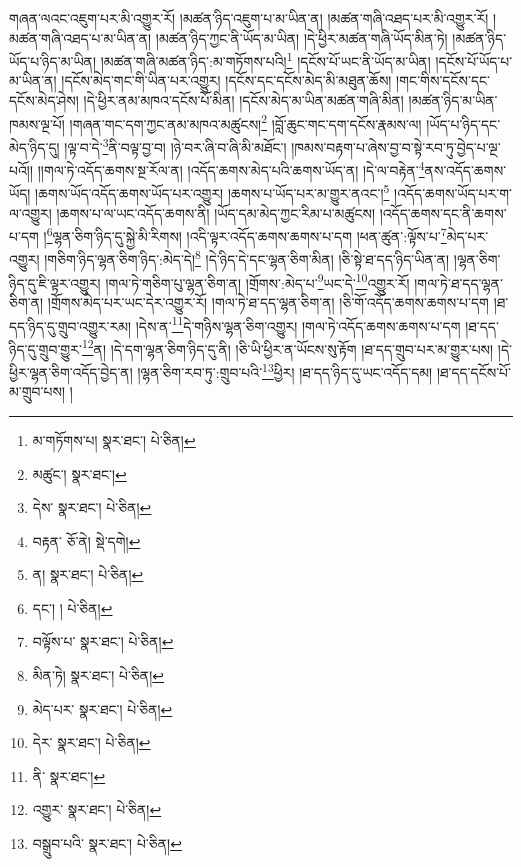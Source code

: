 གཞན་ལའང་འཇུག་པར་མི་འགྱུར་རོ། །མཚན་ཉིད་འཇུག་པ་མ་ཡིན་ན། །མཚན་གཞི་འཐད་པར་མི་འགྱུར་རོ། །མཚན་གཞི་འཐད་པ་མ་ཡིན་ན། །མཚན་ཉིད་ཀྱང་ནི་ཡོད་མ་ཡིན། །དེ་ཕྱིར་མཚན་གཞི་ཡོད་མིན་ཏེ། །མཚན་ཉིད་ཡོད་པ་ཉིད་མ་ཡིན། །མཚན་གཞི་མཚན་ཉིད་:མ་གཏོགས་པའི།\footnote{མ་གཏོགས་པ།  སྣར་ཐང་།  པེ་ཅིན། } །དངོས་པོ་ཡང་ནི་ཡོད་མ་ཡིན། །དངོས་པོ་ཡོད་པ་མ་ཡིན་ན། །དངོས་མེད་གང་གི་ཡིན་པར་འགྱུར། །དངོས་དང་དངོས་མེད་མི་མཐུན་ཆོས། །གང་གིས་དངོས་དང་དངོས་མེད་ཤེས། །དེ་ཕྱིར་ནམ་མཁའ་དངོས་པོ་མིན། །དངོས་མེད་མ་ཡིན་མཚན་གཞི་མིན། །མཚན་ཉིད་མ་ཡིན་ཁམས་ལྔ་པོ། །གཞན་གང་དག་ཀྱང་ནམ་མཁའ་མཚུངས།\footnote{མཚུང་།  སྣར་ཐང་། } །བློ་ཆུང་གང་དག་དངོས་རྣམས་ལ། །ཡོད་པ་ཉིད་དང་མེད་ཉིད་དུ། །ལྟ་བ་དེ་\footnote{དེས་  སྣར་ཐང་།  པེ་ཅིན། }ནི་བལྟ་བྱ་བ། །ཉེ་བར་ཞི་བ་ཞི་མི་མཐོང་། །ཁམས་བརྟག་པ་ཞེས་བྱ་བ་སྟེ་རབ་ཏུ་བྱེད་པ་ལྔ་པའོ།། །།གལ་ཏེ་འདོད་ཆགས་སྔ་རོལ་ན། །འདོད་ཆགས་མེད་པའི་ཆགས་ཡོད་ན། །དེ་ལ་བརྟེན་\footnote{བརྟན་  ཅོ་ནེ།  སྡེ་དགེ། }ནས་འདོད་ཆགས་ཡོད། །ཆགས་ཡོད་འདོད་ཆགས་ཡོད་པར་འགྱུར། །ཆགས་པ་ཡོད་པར་མ་གྱུར་ནའང་།\footnote{ན།  སྣར་ཐང་།  པེ་ཅིན། } །འདོད་ཆགས་ཡོད་པར་ག་ལ་འགྱུར། །ཆགས་པ་ལ་ཡང་འདོད་ཆགས་ནི། །ཡོད་དམ་མེད་ཀྱང་རིམ་པ་མཚུངས། །འདོད་ཆགས་དང་ནི་ཆགས་པ་དག །\footnote{དང་། །  པེ་ཅིན། }ལྷན་ཅིག་ཉིད་དུ་སྐྱེ་མི་རིགས། །འདི་ལྟར་འདོད་ཆགས་ཆགས་པ་དག །ཕན་ཚུན་:ལྟོས་པ་\footnote{བལྟོས་པ་  སྣར་ཐང་།  པེ་ཅིན། }མེད་པར་འགྱུར། །གཅིག་ཉིད་ལྷན་ཅིག་ཉིད་:མེད་དེ།\footnote{མིན་ཏེ།  སྣར་ཐང་།  པེ་ཅིན། } །དེ་ཉིད་དེ་དང་ལྷན་ཅིག་མིན། །ཅི་སྟེ་ཐ་དད་ཉིད་ཡིན་ན། །ལྷན་ཅིག་ཉིད་དུ་ཇི་ལྟར་འགྱུར། །གལ་ཏེ་གཅིག་པུ་ལྷན་ཅིག་ན། །གྲོགས་:མེད་པ་\footnote{མེད་པར་  སྣར་ཐང་།  པེ་ཅིན། }ཡང་དེ་\footnote{དེར་  སྣར་ཐང་།  པེ་ཅིན། }འགྱུར་རོ། །གལ་ཏེ་ཐ་དད་ལྷན་ཅིག་ན། །གྲོགས་མེད་པར་ཡང་དེར་འགྱུར་རོ། །གལ་ཏེ་ཐ་དད་ལྷན་ཅིག་ན། །ཅི་གོ་འདོད་ཆགས་ཆགས་པ་དག །ཐ་དད་ཉིད་དུ་གྲུབ་འགྱུར་རམ། །དེས་ན་\footnote{ནི་  སྣར་ཐང་། }དེ་གཉིས་ལྷན་ཅིག་འགྱུར། །གལ་ཏེ་འདོད་ཆགས་ཆགས་པ་དག །ཐ་དད་ཉིད་དུ་གྲུབ་གྱུར་\footnote{འགྱུར་  སྣར་ཐང་།  པེ་ཅིན། }ན། །དེ་དག་ལྷན་ཅིག་ཉིད་དུ་ནི། །ཅི་ཡི་ཕྱིར་ན་ཡོངས་སུ་རྟོག །ཐ་དད་གྲུབ་པར་མ་གྱུར་པས། །དེ་ཕྱིར་ལྷན་ཅིག་འདོད་བྱེད་ན། །ལྷན་ཅིག་རབ་ཏུ་:གྲུབ་པའི་\footnote{བསྒྲུབ་པའི་  སྣར་ཐང་།  པེ་ཅིན། }ཕྱིར། །ཐ་དད་ཉིད་དུ་ཡང་འདོད་དམ། །ཐ་དད་དངོས་པོ་མ་གྲུབ་པས། །
